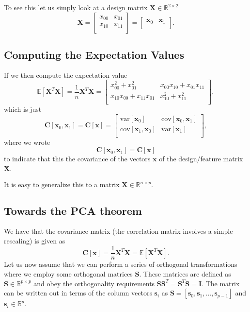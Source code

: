 \documentclass[%
oneside,                 %
final,                   %
10pt]{article}
\begin{document}
To see this let us simply look at a design matrix $\bm{X}\in {\mathbb{R}}^{2\times 2}$
\[
\bm{X}=\begin{bmatrix}
x_{00} & x_{01}\\
x_{10} & x_{11}\\
\end{bmatrix}=\begin{bmatrix}
\bm{x}_{0} & \bm{x}_{1}\\
\end{bmatrix}.
\]

\subsection{Computing the Expectation Values}

If we then compute the expectation value
\[
\mathbb{E}[\bm{X}^T\bm{X}] = \frac{1}{n}\bm{X}^T\bm{X}=\begin{bmatrix}
x_{00}^2+x_{01}^2 & x_{00}x_{10}+x_{01}x_{11}\\
x_{10}x_{00}+x_{11}x_{01} & x_{10}^2+x_{11}^2\\
\end{bmatrix},
\]
which is just 
\[
\bm{C}[\bm{x}_0,\bm{x}_1] = \bm{C}[\bm{x}]=\begin{bmatrix} \mathrm{var}[\bm{x}_0] & \mathrm{cov}[\bm{x}_0,\bm{x}_1] \\
                              \mathrm{cov}[\bm{x}_1,\bm{x}_0] & \mathrm{var}[\bm{x}_1] \\
             \end{bmatrix},
\]
where we wrote $$\bm{C}[\bm{x}_0,\bm{x}_1] = \bm{C}[\bm{x}]$$ to indicate that this the covariance of the vectors $\bm{x}$ of the design/feature matrix $\bm{X}$.

It is easy to generalize this to a matrix $\bm{X}\in {\mathbb{R}}^{n\times p}$.

\subsection{Towards the PCA theorem}

We have that the covariance matrix (the correlation matrix involves a simple rescaling) is given as
\[
\bm{C}[\bm{x}] = \frac{1}{n}\bm{X}^T\bm{X}= \mathbb{E}[\bm{X}^T\bm{X}].
\]
Let us now assume that we can perform a series of orthogonal transformations where we employ some orthogonal matrices $\bm{S}$.
These matrices are defined as $\bm{S}\in {\mathbb{R}}^{p\times p}$ and obey the orthogonality requirements $\bm{S}\bm{S}^T=\bm{S}^T\bm{S}=\bm{I}$. The matrix can be written out in terms of the column vectors $\bm{s}_i$ as $\bm{S}=[\bm{s}_0,\bm{s}_1,\dots,\bm{s}_{p-1}]$ and $\bm{s}_i \in {\mathbb{R}}^{p}$.
\end{document}
